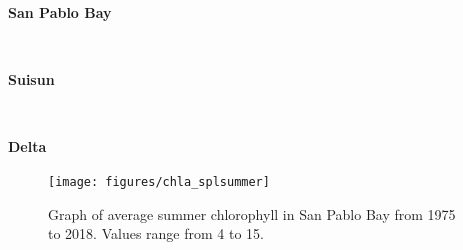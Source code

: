 \documentclass[
]{book}
\begin{document}
\begin{panel-grid}

\begin{columns-nocenter}

\begin{column800}

\textbf{San Pablo Bay}

\end{column800}

\begin{column40}

~

\end{column40}

\begin{column800}

\textbf{Suisun}

\end{column800}

\begin{column40}

~

\end{column40}

\begin{column800}

\textbf{Delta}

\end{column800}

\end{columns-nocenter}

\begin{columns-nocenter}

\begin{column800}

\begin{expand}

\begin{figure}
\texttt{[image: figures/chla\_splsummer]} \caption{Graph of average summer chlorophyll in San Pablo Bay from 1975 to 2018. Values range from 4 to 15.}\label{fig:unnamed-chunk-63}
\end{figure}

\end{expand}

\end{column800}

\begin{column40}

~

\end{column40}


\end{columns-nocenter}
\end{panel-grid}
\end{document}

